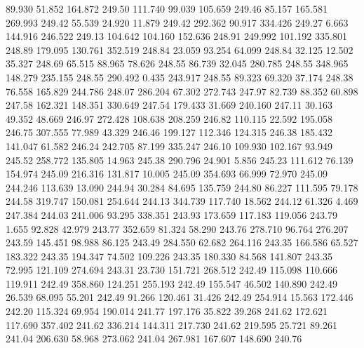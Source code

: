   89.930   51.852  164.872       249.50
 111.740   99.039  105.659       249.46
  85.157  165.581  269.993       249.42
  55.539   24.920   11.879       249.42
 292.362   90.917  334.426       249.27
   6.663  144.916  246.522       249.13
 104.642  104.160  152.636       248.91
 249.992  101.192  335.801       248.89
 179.095  130.761  352.519       248.84
  23.059   93.254   64.099       248.84
  32.125   12.502   35.327       248.69
  65.515   88.965   78.626       248.55
  86.739   32.045  280.785       248.55
 348.965  148.279  235.155       248.55
 290.492    0.435  243.917       248.55
  89.323   69.320   37.174       248.38
  76.558  165.829  244.786       248.07
 286.204   67.302  272.743       247.97
  82.739   88.352   60.898       247.58
 162.321  148.351  330.649       247.54
 179.433   31.669  240.160       247.11
  30.163   49.352   48.669       246.97
 272.428  108.638  208.259       246.82
 110.115   22.592  195.058       246.75
 307.555   77.989   43.329       246.46
 199.127  112.346  124.315       246.38
 185.432  141.047   61.582       246.24
 242.705   87.199  335.247       246.10
 109.930  102.167   93.949       245.52
 258.772  135.805   14.963       245.38
 290.796   24.901    5.856       245.23
 111.612   76.139  154.974       245.09
 216.316  131.817   10.005       245.09
 354.693   66.999   72.970       245.09
 244.246  113.639   13.090       244.94
  30.284   84.695  135.759       244.80
  86.227  111.595   79.178       244.58
 319.747  150.081  254.644       244.13
 344.739  117.740   18.562       244.12
  61.326    4.469  247.384       244.03
 241.006   93.295  338.351       243.93
 173.659  117.183  119.056       243.79
   1.655   92.828   42.979       243.77
 352.659   81.324   58.290       243.76
 278.710   96.764  276.207       243.59
 145.451   98.988   86.125       243.49
 284.550   62.682  264.116       243.35
 166.586   65.527  183.322       243.35
 194.347   74.502  109.226       243.35
 180.330   84.568  141.807       243.35
  72.995  121.109  274.694       243.31
  23.730  151.721  268.512       242.49
 115.098  110.666  119.911       242.49
 358.860  124.251  255.193       242.49
 155.547   46.502  140.890       242.49
  26.539   68.095   55.201       242.49
  91.266  120.461   31.426       242.49
 254.914   15.563  172.446       242.20
 115.324   69.954  190.014       241.77
 197.176   35.822   39.268       241.62
 172.621  117.690  357.402       241.62
 336.214  144.311  217.730       241.62
 219.595   25.721   89.261       241.04
 206.630   58.968  273.062       241.04
 267.981  167.607  148.690       240.76
